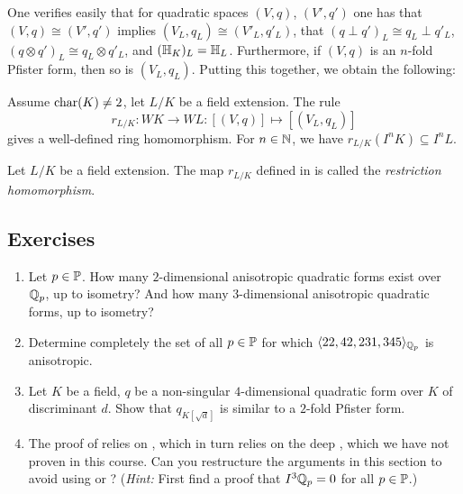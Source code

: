 \documentclass[12pt, leqno, british]{amsart}
\begin{document}
One verifies easily that for quadratic spaces $(V, q)$, $(V', q')$ one has that $(V, q) \cong (V', q')$ implies $(V_L, q_L) \cong (V'_L, q'_L)$, that $(q \perp q')_L \cong q_L \perp q'_L$, $(q \otimes q')_L \cong q_L \otimes q'_L$, and $(\mathbb{H}_K)_L = \mathbb{H}_L$. Furthermore, if $(V, q)$ is an $n$-fold Pfister form, then so is $(V_L, q_L)$.
Putting this together, we obtain the following:
\begin{prop}\label{P:restriction-homomorphism}
Assume $\operatorname{char}(K) \neq 2$, let $L/K$ be a field extension.
The rule
$$ r_{L/K} : WK \to WL : [(V, q)] \mapsto [(V_L, q_L)] $$
gives a well-defined ring homomorphism.
For $n \in \mathbb N$, we have $r_{L/K}(I^n K) \subseteq I^nL$.
\end{prop}
\begin{defi}\label{D:restriction-homomorphism}
Let $L/K$ be a field extension.
The map $r_{L/K}$ defined in  is called the \emph{restriction homomorphism}.
\end{defi}

\subsection{Exercises}
\begin{enumerate}
\item Let $p \in \mathbb P$.
How many $2$-dimensional anisotropic quadratic forms exist over $\mathbb Q_p$, up to isometry?
And how many $3$-dimensional anisotropic quadratic forms, up to isometry?
\item Determine completely the set of all $p \in \mathbb P$ for which $\langle 22, 42, 231, 345 \rangle_{\mathbb Q_p}$ is anisotropic.
\item Let $K$ be a field, $q$ be a non-singular $4$-dimensional quadratic form over $K$ of discriminant $d$.
Show that $q_{K[\sqrt{d}]}$ is similar to a $2$-fold Pfister form.
\item The proof of  relies on , which in turn relies on the deep , which we have not proven in this course.
Can you restructure the arguments in this section to avoid using  or ? (\textit{Hint:} First find a proof that $I^3 \mathbb Q_p = 0$ for all $p \in \mathbb P$.)
\end{enumerate}
\end{document}
